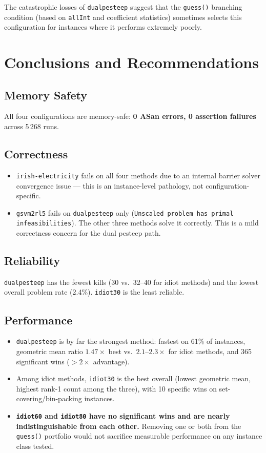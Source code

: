\documentclass[11pt,a4paper]{article}
\begin{document}
The catastrophic losses of \texttt{dualpesteep} suggest that the \texttt{guess()}
branching condition (based on \texttt{allInt} and coefficient statistics) sometimes
selects this configuration for instances where it performs extremely poorly.

\section{Conclusions and Recommendations}

\subsection{Memory Safety}
All four configurations are memory-safe: \textbf{0 ASan errors, 0 assertion
failures} across 5\,268 runs.

\subsection{Correctness}
\begin{itemize}
  \item \texttt{irish-electricity} fails on all four methods due to an internal
        barrier solver convergence issue — this is an instance-level pathology,
        not configuration-specific.
  \item \texttt{gsvm2rl5} fails on \texttt{dualpesteep} only (\texttt{Unscaled
        problem has primal infeasibilities}). The other three methods solve it
        correctly. This is a mild correctness concern for the dual pesteep path.
\end{itemize}

\subsection{Reliability}
\texttt{dualpesteep} has the fewest kills (30 vs.\ 32--40 for idiot methods) and
the lowest overall problem rate (2.4\%). \texttt{idiot30} is the least reliable.

\subsection{Performance}
\begin{itemize}
  \item \texttt{dualpesteep} is by far the strongest method: fastest on 61\% of
        instances, geometric mean ratio $1.47\times$ best vs.\ $2.1$--$2.3\times$
        for idiot methods, and 365 significant wins ($>2\times$ advantage).
  \item Among idiot methods, \texttt{idiot30} is the best overall (lowest
        geometric mean, highest rank-1 count among the three), with 10 specific
        wins on set-covering/bin-packing instances.
  \item \textbf{\texttt{idiot60} and \texttt{idiot80} have no significant wins
        and are nearly indistinguishable from each other.} Removing one or both
        from the \texttt{guess()} portfolio would not sacrifice measurable
        performance on any instance class tested.
\end{itemize}
\end{document}

